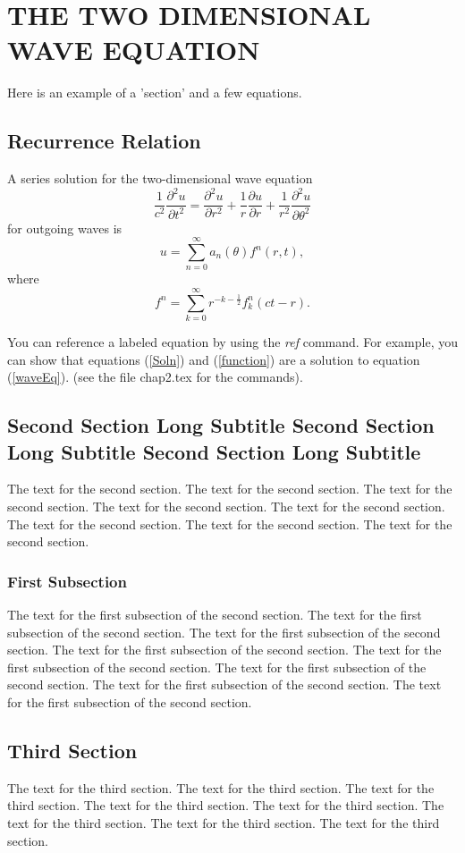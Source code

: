 \chapter{THE TWO DIMENSIONAL WAVE EQUATION} \label{2DWaveEquation}

Here is an example of a 'section' and a few equations.

\section{Recurrence Relation}

A series solution for the two-dimensional wave equation
\begin{equation}
\frac{1}{c^{2}}\frac{\partial^{2}u}{\partial t^{2}} = \frac{\partial^{2}u}{\partial r^{2}} + %
        \frac{1}{r}\frac{\partial u}{\partial r} + \frac{1}{r^{2}}\frac{\partial^{2}u}%
        {\partial\theta^{2}}                                                                 \label{waveEq}
\end{equation}
for outgoing waves is
\begin{equation}
u = \sum_{n=0}^{\infty}a_{n}(\theta)f^{n}(r,t),                                              \label{Soln}
\end{equation}
where
\begin{equation}
f^{n} = \sum_{k=0}^{\infty}r^{-k-\frac{1}{2}}f_{k}^{n}(ct-r).                                \label{function}
\end{equation} %

You can reference a labeled equation by using the \textit{ref}
command.  For example, you can show that equations (\ref{Soln}) and
(\ref{function}) are a solution to equation (\ref{waveEq}).  (see the
file chap2.tex for the commands).

\section{Second Section Long Subtitle Second Section Long Subtitle Second Section Long Subtitle}
The text for the second section.  The text for the second section.
The text for the second section.  The text for the second section.
The text for the second section.  The text for the second section.
The text for the second section.  The text for the second section.

\subsection{First Subsection}
The text for the first subsection of the second section.  The text for
the first subsection of the second section.  The text for the first
subsection of the second section.  The text for the first subsection
of the second section.  The text for the first subsection of the
second section.  The text for the first subsection of the second
section.  The text for the first subsection of the second section.
The text for the first subsection of the second section.

\section{Third Section}
The text for the third section.  The text for the third section.  The
text for the third section.  The text for the third section.  The text
for the third section.  The text for the third section.  The text for
the third section.  The text for the third section.
